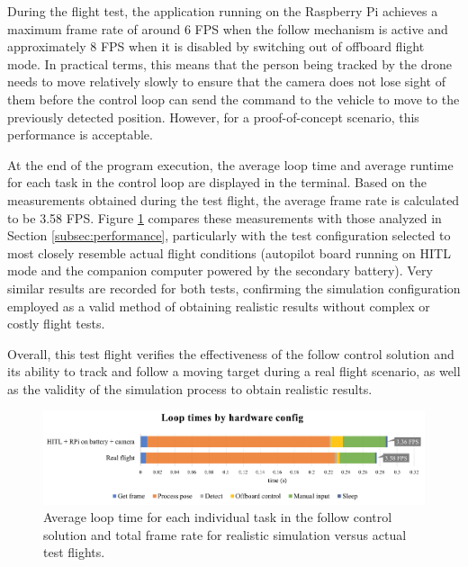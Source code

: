 During the flight test, the application running on the Raspberry Pi achieves a maximum frame rate of around 6 FPS when the follow mechanism is active and approximately 8 FPS when it is disabled by switching out of offboard flight mode. In practical terms, this means that the person being tracked by the drone needs to move relatively slowly to ensure that the camera does not lose sight of them before the control loop can send the command to the vehicle to move to the previously detected position. However, for a proof-of-concept scenario, this performance is acceptable.


At the end of the program execution, the average loop time and average runtime for each task in the control loop are displayed in the terminal. Based on the measurements obtained during the test flight, the average frame rate is calculated to be 3.58 FPS. Figure \ref{fig:flight-performance} compares these measurements with those analyzed in Section \ref{subsec:performance}, particularly with the test configuration selected to most closely resemble actual flight conditions (autopilot board running on HITL mode and the companion computer powered by the secondary battery). Very similar results are recorded for both tests, confirming the simulation configuration employed as a valid method of obtaining realistic results without complex or costly flight tests.

Overall, this test flight verifies the effectiveness of the follow control solution and its ability to track and follow a moving target during a real flight scenario, as well as the validity of the simulation process to obtain realistic results.


\begin{figure}
  \centering
  \includegraphics[width=\textwidth, keepaspectratio]{img/perf-hitl-flight.png}
  \caption{Average loop time for each individual task in the follow control solution and total frame rate for realistic simulation versus actual test flights.}
  \label{fig:flight-performance}
\end{figure}
